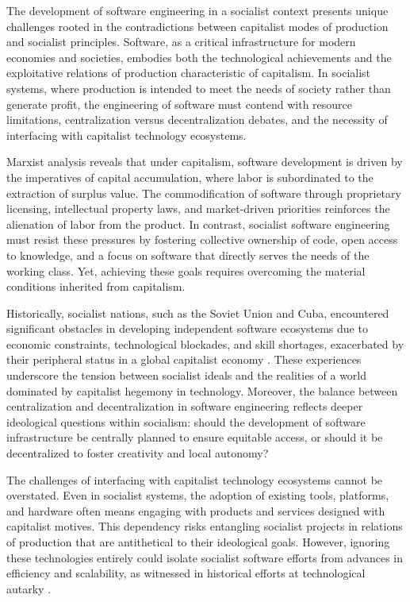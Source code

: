 \begin{refsection}
The development of software engineering in a socialist context presents unique challenges rooted in the contradictions between capitalist modes of production and socialist principles. Software, as a critical infrastructure for modern economies and societies, embodies both the technological achievements and the exploitative relations of production characteristic of capitalism. In socialist systems, where production is intended to meet the needs of society rather than generate profit, the engineering of software must contend with resource limitations, centralization versus decentralization debates, and the necessity of interfacing with capitalist technology ecosystems. 

Marxist analysis reveals that under capitalism, software development is driven by the imperatives of capital accumulation, where labor is subordinated to the extraction of surplus value. The commodification of software through proprietary licensing, intellectual property laws, and market-driven priorities reinforces the alienation of labor from the product. In contrast, socialist software engineering must resist these pressures by fostering collective ownership of code, open access to knowledge, and a focus on software that directly serves the needs of the working class. Yet, achieving these goals requires overcoming the material conditions inherited from capitalism. 

Historically, socialist nations, such as the Soviet Union and Cuba, encountered significant obstacles in developing independent software ecosystems due to economic constraints, technological blockades, and skill shortages, exacerbated by their peripheral status in a global capitalist economy \cite[pp.~137-141]{braverman}. These experiences underscore the tension between socialist ideals and the realities of a world dominated by capitalist hegemony in technology. Moreover, the balance between centralization and decentralization in software engineering reflects deeper ideological questions within socialism: should the development of software infrastructure be centrally planned to ensure equitable access, or should it be decentralized to foster creativity and local autonomy?

The challenges of interfacing with capitalist technology ecosystems cannot be overstated. Even in socialist systems, the adoption of existing tools, platforms, and hardware often means engaging with products and services designed with capitalist motives. This dependency risks entangling socialist projects in relations of production that are antithetical to their ideological goals. However, ignoring these technologies entirely could isolate socialist software efforts from advances in efficiency and scalability, as witnessed in historical efforts at technological autarky \cite[pp.~88-92]{nove}.


\end{refsection}
